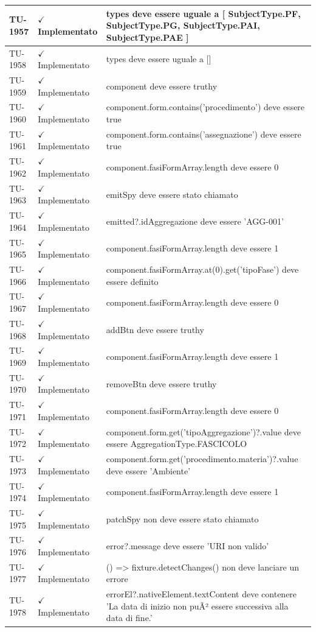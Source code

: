 ﻿\documentclass[a4paper,12pt]{article}
\newcommand{\ok}{\textcolor{green!60!black}{$\checkmark$ Implementato}}
\begin{document}
\begin{longtable}{|p{2cm}|p{3.5cm}|p{9.5cm}|}
\hline
TU-1957 & \ok & types deve essere uguale a [ SubjectType.PF, SubjectType.PG, SubjectType.PAI, SubjectType.PAE ] \\
\hline
TU-1958 & \ok & types deve essere uguale a [] \\
\hline
TU-1959 & \ok & component deve essere truthy \\
\hline
TU-1960 & \ok & component.form.contains('procedimento') deve essere true \\
\hline
TU-1961 & \ok & component.form.contains('assegnazione') deve essere true \\
\hline
TU-1962 & \ok & component.fasiFormArray.length deve essere 0 \\
\hline
TU-1963 & \ok & emitSpy deve essere stato chiamato \\
\hline
TU-1964 & \ok & emitted?.idAggregazione deve essere 'AGG-001' \\
\hline
TU-1965 & \ok & component.fasiFormArray.length deve essere 1 \\
\hline
TU-1966 & \ok & component.fasiFormArray.at(0).get('tipoFase') deve essere definito \\
\hline
TU-1967 & \ok & component.fasiFormArray.length deve essere 0 \\
\hline
TU-1968 & \ok & addBtn deve essere truthy \\
\hline
TU-1969 & \ok & component.fasiFormArray.length deve essere 1 \\
\hline
TU-1970 & \ok & removeBtn deve essere truthy \\
\hline
TU-1971 & \ok & component.fasiFormArray.length deve essere 0 \\
\hline
TU-1972 & \ok & component.form.get('tipoAggregazione')?.value deve essere AggregationType.FASCICOLO \\
\hline
TU-1973 & \ok & component.form.get('procedimento.materia')?.value deve essere 'Ambiente' \\
\hline
TU-1974 & \ok & component.fasiFormArray.length deve essere 1 \\
\hline
TU-1975 & \ok & patchSpy non deve essere stato chiamato \\
\hline
TU-1976 & \ok & error?.message deve essere 'URI non valido' \\
\hline
TU-1977 & \ok & () => fixture.detectChanges() non deve lanciare un errore \\
\hline
TU-1978 & \ok & errorEl?.nativeElement.textContent deve contenere 'La data di inizio non puÃ² essere successiva alla data di fine.' \\

\end{longtable}
\end{document}
